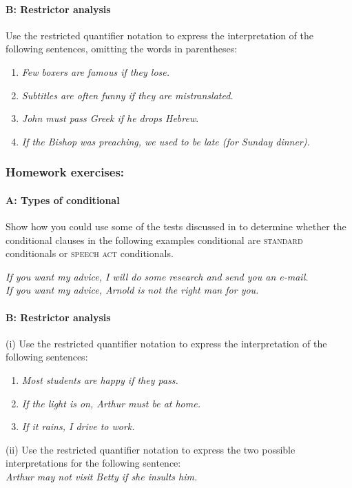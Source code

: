 \paragraph{B: Restrictor analysis}

Use the restricted quantifier notation to express the interpretation of the following sentences, omitting the words in parentheses:

\begin{enumerate}
\item 
\textit{Few boxers are famous if they lose.}
\item \itshape
Subtitles are often funny if they are mistranslated.
\item 
\textit{John must pass Greek if he drops Hebrew}.
\item 
\textit{If the Bishop was preaching, we used to be late (for Sunday dinner).}
\end{enumerate}
\subsubsection{Homework exercises:}\label{sec:}
\paragraph{A: Types of conditional}

Show how you could use some of the tests discussed in  to determine whether the conditional clauses in the following examples conditional are \textsc{standard} conditionals or \textsc{speech act} conditionals.

\ea \ea \itshape If you want my advice, I will do some research and send you an e-mail.\\
\ex If you want my advice, Arnold is not the right man for you.
\z \z

\paragraph{B: Restrictor analysis}

(i) Use the restricted quantifier notation to express the interpretation of the following sentences:

\begin{enumerate}
\item \itshape
Most students are happy if they pass.
\item \itshape
If the light is on, Arthur must be at home.
\item \itshape
If it rains, I drive to work.
\end{enumerate}
\ea
(ii) Use the restricted quantifier notation to express the two possible interpretations for the following sentence:\\
\textit{Arthur may not visit Betty if she insults him.}
\z

